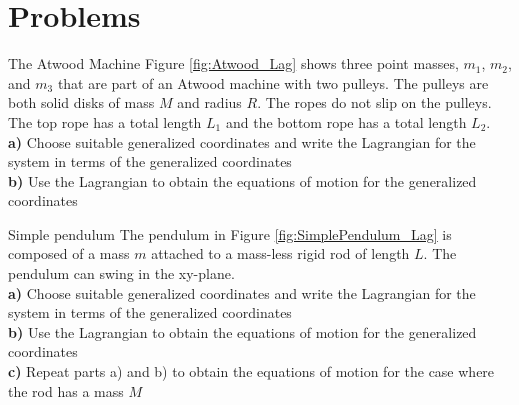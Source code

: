 %
\section{Problems}

\begin{problem}{The Atwood Machine}
Figure \ref{fig:Atwood_Lag} shows three point masses, $m_1$, $m_2$, and $m_3$ that are part of an Atwood machine with two pulleys. The pulleys are both solid disks of mass $M$ and radius $R$. The ropes do not slip on the pulleys. The top rope has a total length $L_1$ and the bottom rope has a total length $L_2$.
\\
\textbf{a)} Choose suitable generalized coordinates and write the Lagrangian for the system in terms of the generalized coordinates\\
\textbf{b)} Use the Lagrangian to obtain the equations of motion for the generalized coordinates\\
\label{prob_Lagrange_1}
\end{problem}

\begin{problem}{Simple pendulum}
The pendulum in Figure \ref{fig:SimplePendulum_Lag} is composed of a mass $m$ attached to a mass-less rigid rod of length $L$. The pendulum can swing in the xy-plane. 
\\
\textbf{a)} Choose suitable generalized coordinates and write the Lagrangian for the system in terms of the generalized coordinates\\
\textbf{b)} Use the Lagrangian to obtain the equations of motion for the generalized coordinates\\
\textbf{c)} Repeat parts a) and b) to obtain the equations of motion for the case where the rod has a mass $M$\\
\label{prob_Lagrange_2}
\end{problem}

